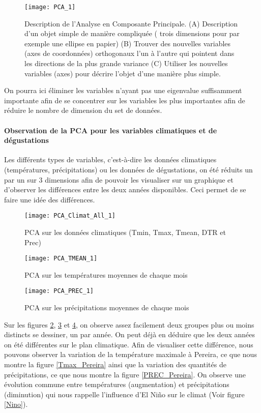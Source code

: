 \begin{figure}[H]
	\texttt{[image: PCA\_1]}
	\caption{\label{PCAdefinition} Description de l'Analyse en Composante Principale. (A) Description d'un objet simple de manière compliquée ( trois dimensions pour par exemple une ellipse en papier) (B) Trouver des nouvelles variables (axes de coordonnées) orthogonaux l'un à l'autre qui pointent dans les directions de la plus grande variance (C) Utiliser les nouvelles variables (axes) pour décrire l'objet d'une manière plus simple. }
\end{figure}

\noindent On pourra ici éliminer les variables n'ayant pas une eigenvalue suffisamment importante afin de se concentrer sur les variables les plus importantes afin de réduire le nombre de dimension du set de données. 





\paragraph{Observation de la PCA pour les variables climatiques et de dégustations} Les différents types de variables, c'est-à-dire les données climatiques (températures, précipitations) ou les données de dégustations, on été réduits un par un sur 3 dimensions afin de pouvoir les visualiser sur un graphique et d'observer les différences entre les deux années disponibles. Ceci permet de se faire une idée des différences.  

\begin{figure}[H]
	\texttt{[image: PCA\_Climat\_All\_1]}
	\caption{\label{PCAClimatAll} PCA sur les données climatiques (Tmin, Tmax, Tmean, DTR et Prec) }
\end{figure}

\begin{figure}[H]
	\texttt{[image: PCA\_TMEAN\_1]}
	\caption{\label{PCAClimatTmean} PCA sur les températures moyennes de chaque mois }
\end{figure}

\begin{figure}[H]
	\texttt{[image: PCA\_PREC\_1]}
	\caption{\label{PCAClimatPrec} PCA sur les précipitations moyennes de chaque mois }
\end{figure}


\noindent Sur les figures \ref{PCAClimatAll}, \ref{PCAClimatTmean} et \ref{PCAClimatPrec}, on observe assez facilement deux groupes plus ou moins distincts se dessiner, un par année. On peut déjà en déduire que les deux années on été différentes sur le plan climatique. Afin de visualiser cette différence, nous pouvons observer la variation de la température maximale à Pereira, ce que nous montre la figure \ref{Tmax_Pereira} ainsi que la variation des quantités de précipitations, ce que nous montre la figure \ref{PREC_Pereira}. On observe une évolution commune entre températures (augmentation) et précipitations (diminution) qui nous rappelle l'influence d'El Niño sur le climat (Voir figure \ref{Nino}).

